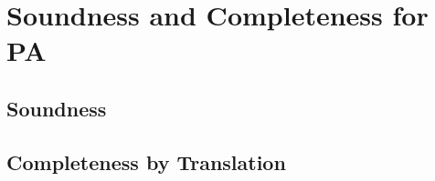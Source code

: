 \chapter{Soundness and Completeness for PA}\label{ch:pa}

\section{Soundness}\label{sec:pa-soundness}

\section{Completeness by Translation}\label{sec:pa-completeness}
